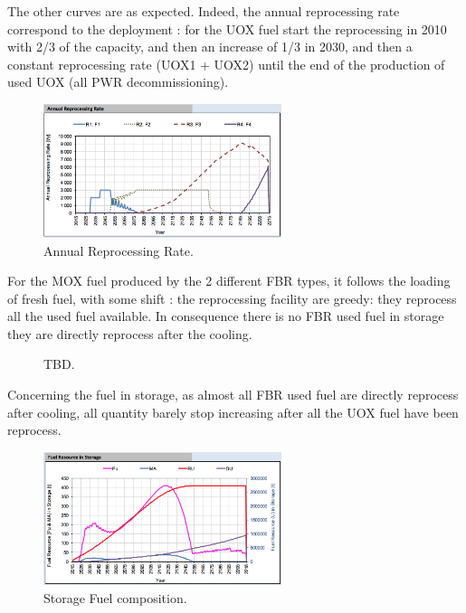 \documentclass[12pt]{article}
\begin{document}
The other curves are as expected. Indeed, the
annual reprocessing rate correspond to the
deployment :  for the UOX fuel start the
reprocessing in 2010 with 2/3 of the capacity, and
then an increase of 1/3 in 2030, and then a
constant reprocessing rate (UOX1 + UOX2) until the
end of the production of used UOX (all PWR
decommissioning).


\begin{figure}[h!]
\centering
\includegraphics[width=0.62\textwidth]	{img/AnnualReprocessingRate_1}
\caption{Annual Reprocessing Rate.}
\label{fig:reprocessing_1}
\end{figure}


For the MOX fuel produced by the 2 different FBR
types, it follows the loading of fresh fuel, with
some shift : the reprocessing facility are greedy:
they reprocess all the used fuel available. In
consequence there is no FBR used fuel in storage
they are directly reprocess after the cooling.


\begin{figure}[h!]
\centering
{}
\caption{TBD.\label{fig:cool_reprocc} }
\end{figure}


Concerning the fuel in storage, as almost all FBR
used fuel are directly reprocess after cooling,
all quantity barely stop increasing after all the
UOX fuel have been reprocess.

\begin{figure}[h!]
\centering
\includegraphics[width=0.62\textwidth]{img/FuelInStorage_1}
\caption{Storage Fuel composition.}
\label{fig:storagecompo_1}
\end{figure}
\end{document}
